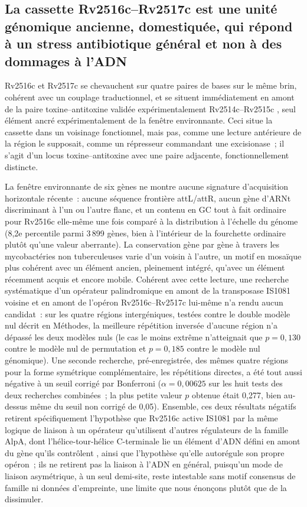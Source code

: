 \documentclass[11pt,a4paper]{article}
\begin{document}
\subsection{La cassette Rv2516c--Rv2517c est une unité génomique ancienne, domestiquée, qui répond
à un stress antibiotique général et non à des dommages à l'ADN}

Rv2516c et Rv2517c se chevauchent sur quatre paires de bases sur le même brin, cohérent avec un
couplage traductionnel, et se situent immédiatement en amont de la paire toxine--antitoxine validée
expérimentalement Rv2514c--Rv2515c \citep{tandon2019ta}, seul élément ancré expérimentalement de la
fenêtre environnante. Ceci situe la cassette dans un voisinage fonctionnel, mais pas, comme une
lecture antérieure de la région le supposait, comme un répresseur commandant une excisionase~; il
s'agit d'un locus toxine--antitoxine avec une paire adjacente, fonctionnellement distincte.

La fenêtre environnante de six gènes ne montre aucune signature d'acquisition horizontale récente~:
aucune séquence frontière attL/attR, aucun gène d'ARNt discriminant à l'un ou l'autre flanc, et un
contenu en GC tout à fait ordinaire pour Rv2516c elle-même une fois comparé à la distribution à
l'échelle du génome (8,2e percentile parmi 3\,899 gènes, bien à l'intérieur de la fourchette
ordinaire plutôt qu'une valeur aberrante). La conservation gène par gène à travers les mycobactéries
non tuberculeuses varie d'un voisin à l'autre, un motif en mosaïque plus cohérent avec un élément
ancien, pleinement intégré, qu'avec un élément récemment acquis et encore mobile. Cohérent avec
cette lecture, une recherche systématique d'un opérateur palindromique en amont de la transposase
IS1081 voisine et en amont de l'opéron Rv2516c--Rv2517c lui-même n'a rendu aucun candidat~: sur les
quatre régions intergéniques, testées contre le double modèle nul décrit en Méthodes, la meilleure
répétition inversée d'aucune région n'a dépassé les deux modèles nuls (le cas le moins extrême
n'atteignait que $p=0,130$ contre le modèle nul de permutation et $p=0,185$ contre le modèle nul
génomique). Une seconde recherche, pré-enregistrée, des mêmes quatre régions pour la forme
symétrique complémentaire, les répétitions directes, a été tout aussi négative à un seuil corrigé
par Bonferroni ($\alpha=0,00625$ sur les huit tests des deux recherches combinées~; la plus petite
valeur $p$ obtenue était 0,277, bien au-dessus même du seuil non corrigé de 0,05). Ensemble, ces
deux résultats négatifs retirent spécifiquement l'hypothèse que Rv2516c active IS1081 par la même
logique de liaison à un opérateur qu'utilisent d'autres régulateurs de la famille AlpA, dont
l'hélice-tour-hélice C-terminale lie un élément d'ADN défini en amont du gène qu'ils contrôlent
\citep{wen2022alpa}, ainsi que l'hypothèse qu'elle autorégule son propre opéron~; ils ne retirent
pas la liaison à l'ADN en général, puisqu'un mode de liaison asymétrique, à un seul demi-site,
reste intestable sans motif consensus de famille ni données d'empreinte, une limite que nous
énonçons plutôt que de la dissimuler.
\end{document}
